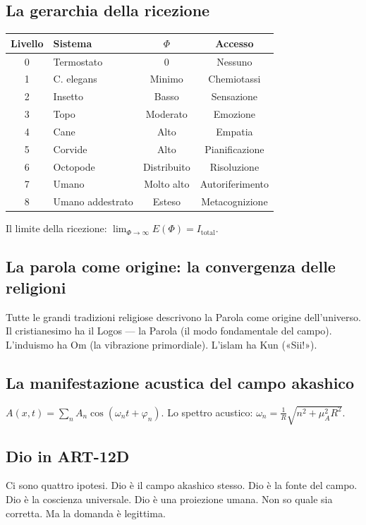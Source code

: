\documentclass[11pt,a4paper]{article}
\begin{document}
\subsection{La gerarchia della ricezione}
\begin{table}[H]
\centering
\begin{tabular}{@{}clcc@{}}
\toprule
\textbf{Livello} & \textbf{Sistema} & \textbf{$\Phi$} & \textbf{Accesso} \\ \midrule
0 & Termostato & 0 & Nessuno \\
1 & C. elegans & Minimo & Chemiotassi \\
2 & Insetto & Basso & Sensazione \\
3 & Topo & Moderato & Emozione \\
4 & Cane & Alto & Empatia \\
5 & Corvide & Alto & Pianificazione \\
6 & Octopode & Distribuito & Risoluzione \\
7 & Umano & Molto alto & Autoriferimento \\
8 & Umano addestrato & Esteso & Metacognizione \\ \bottomrule
\end{tabular}
\end{table}
Il limite della ricezione: $\lim_{\Phi \rightarrow \infty} E(\Phi) = I_{\text{total}}$.

\subsection{La parola come origine: la convergenza delle religioni}
Tutte le grandi tradizioni religiose descrivono la Parola come origine dell'universo. Il cristianesimo ha il Logos --- la Parola (il modo fondamentale del campo). L'induismo ha Om (la vibrazione primordiale). L'islam ha Kun («Sii!»).

\subsection{La manifestazione acustica del campo akashico}
$A(x,t) = \sum_n A_n \cos(\omega_n t + \varphi_n)$. Lo spettro acustico: $\omega_n = \frac{1}{R} \sqrt{n^2 + \mu_A^2 R^2}$.

\subsection{Dio in ART-12D}
Ci sono quattro ipotesi. Dio è il campo akashico stesso. Dio è la fonte del campo. Dio è la coscienza universale. Dio è una proiezione umana. Non so quale sia corretta. Ma la domanda è legittima.
\end{document}
